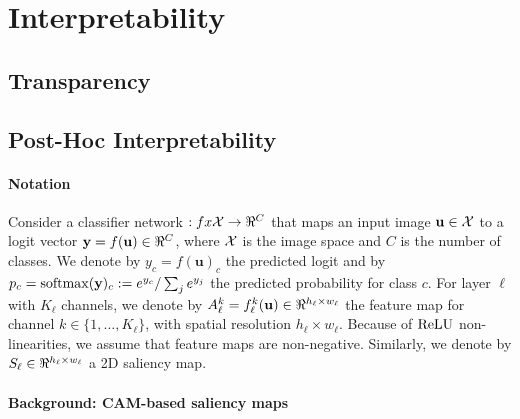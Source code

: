 \section{Interpretability}
\label{rel:sec_int}


\subsection{Transparency}
\label{rel:sub_transp}

\subsection{Post-Hoc Interpretability}
\label{rel:sub_post}

\paragraph{Notation}
\label{sec:oc_notation}

Consider a classifier network $:fx \cX \to \real^C$ that maps an input image $\mathbf{u} \in \mathcal{X}$ to a 
logit vector $\vy = f(\mathbf{u}) \in \real^C$, where $\mathcal{X}$ is the image space and $C$ is the number 
of classes. We denote by $y_c = f(\mathbf{u})_c$ the predicted logit and by $p_c = \operatorname{softmax}(\mathbf{y})_c 
\mathrel{:=} e^{y_c} / \sum_j e^{y_j}$ the predicted probability for class $c$. For layer $\ell$ 
with $K_\ell$ channels, we denote by $A^k_\ell = f^k_\ell(\mathbf{u}) \in \real^{h_\ell \times w_\ell}$ 
the feature map for channel $k \in \{1,\dots,K_\ell\}$, with spatial resolution $h_\ell \times 
w_\ell$. Because of ${\operatorname{ReLU}}$ non-linearities, we assume that feature maps are non-negative. 
Similarly, we denote by $S_\ell \in \real^{h_\ell \times w_\ell}$ a 2D saliency map.


\paragraph{Background: CAM-based saliency maps}
\label{sec:oc_back}

